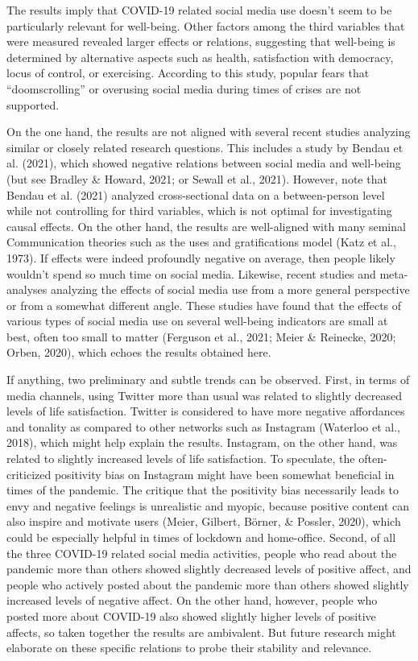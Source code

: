 \documentclass[
  man,mask]{apa6}
\begin{document}
The results imply that COVID-19 related social media use doesn't seem to be particularly relevant for well-being.
Other factors among the third variables that were measured revealed larger effects or relations, suggesting that well-being is determined by alternative aspects such as health, satisfaction with democracy, locus of control, or exercising.
According to this study, popular fears that ``doomscrolling'' or overusing social media during times of crises are not supported.

On the one hand, the results are not aligned with several recent studies analyzing similar or closely related research questions.
This includes a study by Bendau et al. (2021), which showed negative relations between social media and well-being (but see Bradley \& Howard, 2021; or Sewall et al., 2021).
However, note that Bendau et al. (2021) analyzed cross-sectional data on a between-person level while not controlling for third variables, which is not optimal for investigating causal effects.
On the other hand, the results are well-aligned with many seminal Communication theories such as the uses and gratifications model (Katz et al., 1973).
If effects were indeed profoundly negative on average, then people likely wouldn't spend so much time on social media.
Likewise, recent studies and meta-analyses analyzing the effects of social media use from a more general perspective or from a somewhat different angle.
These studies have found that the effects of various types of social media use on several well-being indicators are small at best, often too small to matter (Ferguson et al., 2021; Meier \& Reinecke, 2020; Orben, 2020), which echoes the results obtained here.

If anything, two preliminary and subtle trends can be observed.
First, in terms of media channels, using Twitter more than usual was related to slightly decreased levels of life satisfaction.
Twitter is considered to have more negative affordances and tonality as compared to other networks such as Instagram (Waterloo et al., 2018), which might help explain the results.
Instagram, on the other hand, was related to slightly increased levels of life satisfaction.
To speculate, the often-criticized positivity bias on Instagram might have been somewhat beneficial in times of the pandemic.
The critique that the positivity bias necessarily leads to envy and negative feelings is unrealistic and myopic, because positive content can also inspire and motivate users (Meier, Gilbert, Börner, \& Possler, 2020), which could be especially helpful in times of lockdown and home-office.
Second, of all the three COVID-19 related social media activities, people who read about the pandemic more than others showed slightly decreased levels of positive affect, and people who actively posted about the pandemic more than others showed slightly increased levels of negative affect.
On the other hand, however, people who posted more about COVID-19 also showed slightly higher levels of positive affects, so taken together the results are ambivalent.
But future research might elaborate on these specific relations to probe their stability and relevance.
\end{document}

